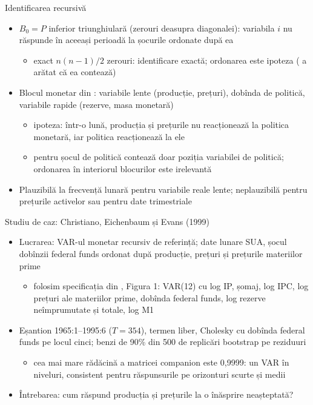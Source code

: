 \begin{frame}{Identificarea recursivă}
\itemsize{\small}
\begin{itemize}
    \item $B_0 = P$ inferior triunghiulară (zerouri deasupra diagonalei): variabila $i$ nu răspunde în aceeași perioadă la șocurile ordonate după ea
    \begin{itemize}
        \item exact $n(n - 1)/2$ zerouri: identificare exactă; ordonarea este ipoteza ( a arătat că ea contează)
    \end{itemize}
    \item Blocul monetar din : variabile lente (producție, prețuri), dobînda de politică, variabile rapide (rezerve, masa monetară)
    \begin{itemize}
        \item ipoteza: într-o lună, producția și prețurile nu reacționează la politica monetară, iar politica reacționează la ele
        \item pentru șocul de politică contează doar poziția variabilei de politică; ordonarea în interiorul blocurilor este irelevantă
    \end{itemize}
    \item Plauzibilă la frecvență lunară pentru variabile reale lente; neplauzibilă pentru prețurile activelor sau pentru date trimestriale
\end{itemize}
\end{frame}

\begin{frame}{Studiu de caz: Christiano, Eichenbaum și Evans (1999)}
\itemsize{\small}
\begin{itemize}
    \item Lucrarea: VAR-ul monetar recursiv de referință; date lunare SUA, șocul dobînzii federal funds ordonat după producție, prețuri și prețurile materiilor prime 
    \begin{itemize}
        \item folosim specificația din , Figura 1: VAR(12) cu log IP, șomaj, log IPC, log prețuri ale materiilor prime, dobînda federal funds, log rezerve neîmprumutate și totale, log M1
    \end{itemize}
    \item Eșantion 1965:1--1995:6 ($T = 354$), termen liber, Cholesky cu dobînda federal funds pe locul cinci; benzi de 90\% din 500 de replicări bootstrap pe reziduuri
    \begin{itemize}
        \item cea mai mare rădăcină a matricei companion este 0{,}9999: un VAR în niveluri, consistent pentru răspunsurile pe orizonturi scurte și medii 
    \end{itemize}
    \item Întrebarea: cum răspund producția și prețurile la o înăsprire neașteptată?
\end{itemize}
\end{frame}

